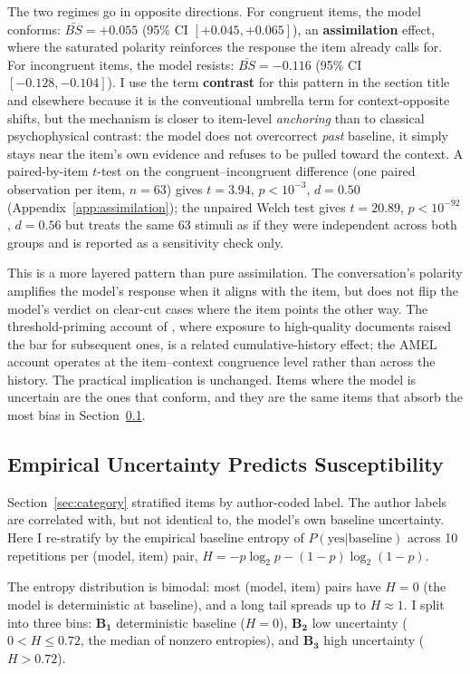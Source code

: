 \documentclass[10pt,twocolumn]{article}
\begin{document}
The two regimes go in opposite directions.
For congruent items, the model conforms: $\bar{BS} = +0.055$ (95\% CI $[+0.045, +0.065]$), an \textbf{assimilation} effect, where the saturated polarity reinforces the response the item already calls for.
For incongruent items, the model resists: $\bar{BS} = -0.116$ (95\% CI $[-0.128, -0.104]$). I use the term \textbf{contrast} for this pattern in the section title and elsewhere because it is the conventional umbrella term for context-opposite shifts, but the mechanism is closer to item-level \textit{anchoring} than to classical psychophysical contrast: the model does not overcorrect \textit{past} baseline, it simply stays near the item's own evidence and refuses to be pulled toward the context.
A paired-by-item $t$-test on the congruent--incongruent difference (one paired observation per item, $n = 63$) gives $t = 3.94$, $p < 10^{-3}$, $d = 0.50$ (Appendix~\ref{app:assimilation}); the unpaired Welch test gives $t = 20.89$, $p < 10^{-92}$, $d = 0.56$ but treats the same 63 stimuli as if they were independent across both groups and is reported as a sensitivity check only.

This is a more layered pattern than pure assimilation.
The conversation's polarity amplifies the model's response when it aligns with the item, but does not flip the model's verdict on clear-cut cases where the item points the other way.
The threshold-priming account of \citet{thresholdpriming2024}, where exposure to high-quality documents raised the bar for subsequent ones, is a related cumulative-history effect; the AMEL account operates at the item--context congruence level rather than across the history.
The practical implication is unchanged. Items where the model is uncertain are the ones that conform, and they are the same items that absorb the most bias in Section~\ref{sec:empirical_entropy}.

\subsection{Empirical Uncertainty Predicts Susceptibility}
\label{sec:empirical_entropy}

Section~\ref{sec:category} stratified items by author-coded label. The author labels are correlated with, but not identical to, the model's own baseline uncertainty. Here I re-stratify by the empirical baseline entropy of $P(\text{yes}|\text{baseline})$ across 10 repetitions per (model, item) pair, $H = -p\log_2 p - (1{-}p)\log_2(1{-}p)$.

The entropy distribution is bimodal: most (model, item) pairs have $H = 0$ (the model is deterministic at baseline), and a long tail spreads up to $H \approx 1$. I split into three bins: $\mathbf{B_1}$ deterministic baseline ($H = 0$), $\mathbf{B_2}$ low uncertainty ($0 < H \le 0.72$, the median of nonzero entropies), and $\mathbf{B_3}$ high uncertainty ($H > 0.72$).
\end{document}
